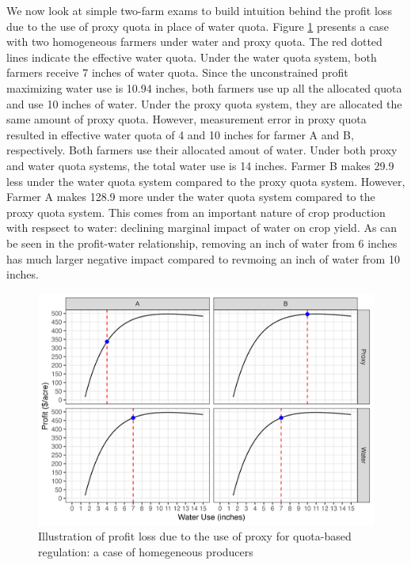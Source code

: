 \documentclass[
]{article}
\begin{document}
We now look at simple two-farm exams to build intuition behind the profit loss due to the use of proxy quota in place of water quota. Figure \ref{fig:illust-homegeneous} presents a case with two homogeneous farmers under water and proxy quota. The red dotted lines indicate the effective water quota. Under the water quota system, both farmers receive 7 inches of water quota. Since the unconstrained profit maximizing water use is 10.94 inches, both farmers use up all the allocated quota and use 10 inches of water. Under the proxy quota system, they are allocated the same amount of proxy quota. However, measurement error in proxy quota resulted in effective water quota of 4 and 10 inches for farmer A and B, respectively. Both farmers use their allocated amout of water. Under both proxy and water quota systems, the total water use is 14 inches. Farmer B makes 29.9 less under the water quota system compared to the proxy quota system. However, Farmer A makes 128.9 more under the water quota system compared to the proxy quota system. This comes from an important nature of crop production with respsect to water: declining marginal impact of water on crop yield. As can be seen in the profit-water relationship, removing an inch of water from 6 inches has much larger negative impact compared to revmoing an inch of water from 10 inches.

\begin{figure}[H]

{\centering \includegraphics{figures/g_illustration_homogeneous} 

}

\caption{Illustration of profit loss due to the use of proxy for quota-based regulation: a case of homegeneous producers}\label{fig:illust-homegeneous}
\end{figure}
\end{document}
